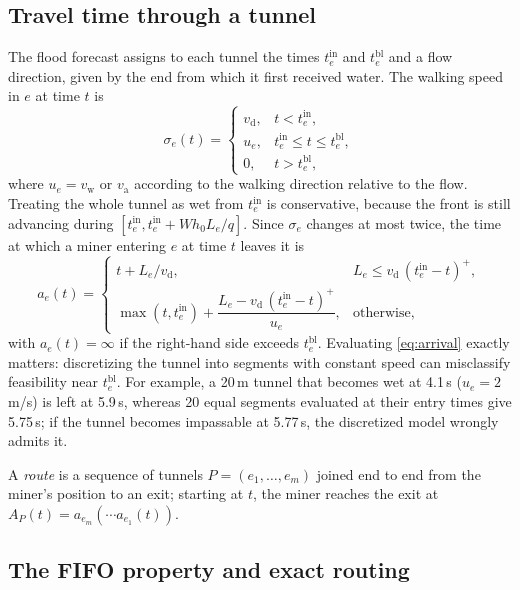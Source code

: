 \documentclass[11pt,a4paper]{article}
\theoremstyle{plain}
\theoremstyle{definition}
\theoremstyle{remark}
\newcommand{\tin}{t^{\mathrm{in}}}
\newcommand{\tbl}{t^{\mathrm{bl}}}
\newcommand{\vd}{v_{\mathrm{d}}}
\newcommand{\vw}{v_{\mathrm{w}}}
\newcommand{\va}{v_{\mathrm{a}}}
\begin{document}
\subsection{Travel time through a tunnel}
The flood forecast assigns to each tunnel the times $\tin_e$ and $\tbl_e$ and a flow direction, given by the end from which it first received water. The walking speed in $e$ at time $t$ is
\begin{equation}
  \sigma_e(t) = \begin{cases}
    \vd, & t < \tin_e,\\
    u_e, & \tin_e \le t \le \tbl_e,\\
    0, & t > \tbl_e,
  \end{cases}
  \label{eq:speed}
\end{equation}
where $u_e = \vw$ or $\va$ according to the walking direction relative to the flow. Treating the whole tunnel as wet from $\tin_e$ is conservative, because the front is still advancing during $[\tin_e, \tin_e + W h_0 L_e/q]$. Since $\sigma_e$ changes at most twice, the time at which a miner entering $e$ at time $t$ leaves it is
\begin{equation}
  a_e(t) = \begin{cases}
    t + L_e/\vd, & L_e \le \vd\,(\tin_e - t)^+,\\[3pt]
    \max(t, \tin_e) + \dfrac{L_e - \vd\,(\tin_e - t)^+}{u_e}, & \text{otherwise},
  \end{cases}
  \label{eq:arrival}
\end{equation}
with $a_e(t) = \infty$ if the right-hand side exceeds $\tbl_e$. Evaluating \eqref{eq:arrival} exactly matters: discretizing the tunnel into segments with constant speed can misclassify feasibility near $\tbl_e$. For example, a 20\,m tunnel that becomes wet at 4.1\,s ($u_e = 2$\,m/s) is left at 5.9\,s, whereas 20 equal segments evaluated at their entry times give 5.75\,s; if the tunnel becomes impassable at 5.77\,s, the discretized model wrongly admits it.

A \emph{route} is a sequence of tunnels $P = (e_1, \dots, e_m)$ joined end to end from the miner's position to an exit; starting at $t$, the miner reaches the exit at $A_P(t) = a_{e_m}(\cdots a_{e_1}(t))$.

\subsection{The FIFO property and exact routing}
\end{document}
